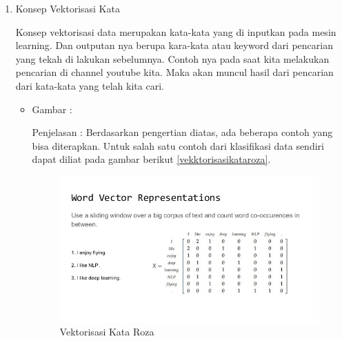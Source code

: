\begin{enumerate}
\item Konsep Vektorisasi Kata 
\par Konsep vektorisasi data merupakan kata-kata yang di inputkan pada mesin learning. Dan outputan nya berupa kara-kata atau keyword dari pencarian yang tekah di lakukan sebelumnya. Contoh nya pada saat kita melakukan pencarian di channel youtube kita. Maka akan muncul hasil dari pencarian dari kata-kata yang telah kita cari.
\par
\begin{itemize}
\item Gambar :
\par Penjelasan : Berdasarkan pengertian diatas, ada beberapa contoh yang bisa diterapkan. Untuk salah satu contoh dari klasifikasi data sendiri dapat diliat pada gambar berikut \ref{vekktorisasikataroza}.
\begin{figure}[!hbtp]
\centering
\includegraphics[scale=0.5]{figures/vekktorisasikataroza.jpg}
\caption{Vektorisasi Kata Roza}
\label{text-fadila}
\end{figure}
\end{itemize}


\end{enumerate}

